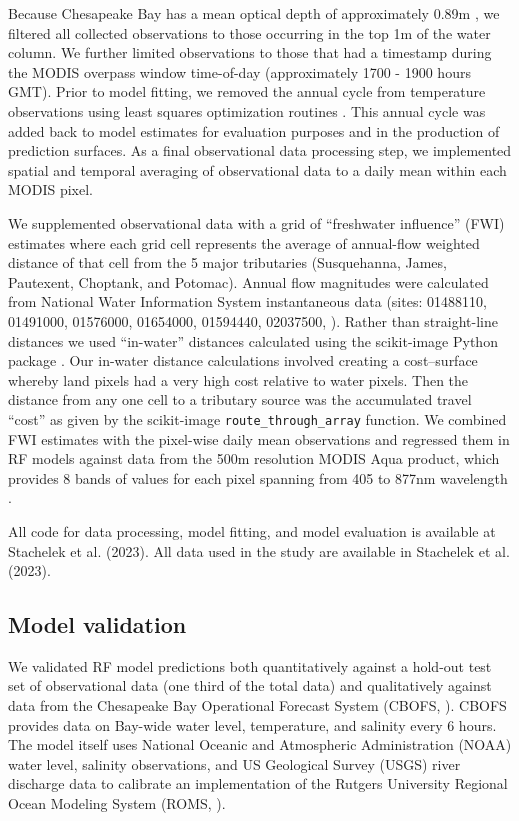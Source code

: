 \documentclass{article}
\begin{document}
Because Chesapeake Bay has a mean optical depth of approximately 0.89m \citep{urquhartRemotelySensedEstimates2012}, we filtered all collected observations to those occurring in the top 1m of the water column. We further limited observations to those that had a timestamp during the MODIS overpass window time-of-day (approximately 1700 - 1900 hours GMT). Prior to model fitting, we removed the annual cycle from temperature observations using least squares optimization routines \citep{virtanenSciPyFundamentalAlgorithms2020a}. This annual cycle was added back to model estimates for evaluation purposes and in the production of prediction surfaces. As a final observational data processing step, we implemented spatial and temporal averaging of observational data to a daily mean within each MODIS pixel. 

We supplemented observational data with a grid of “freshwater influence” (FWI) estimates where each grid cell represents the average of annual-flow weighted distance of that cell from the 5 major tributaries (Susquehanna, James, Pautexent, Choptank, and Potomac). Annual flow magnitudes were calculated from National Water Information System instantaneous data (sites: 01488110, 01491000, 01576000, 01654000, 01594440, 02037500, \citet{nwis2021usgs}). Rather than straight-line distances we used “in-water” distances calculated using the scikit-image Python package \citep{littleKrigingEstuariesCrow1997,vanderwaltScikitimageImageProcessing2014}. Our in-water distance calculations involved creating a cost–surface whereby land pixels had a very high cost relative to water pixels. Then the distance from any one cell to a tributary source was the accumulated travel “cost” as given by the scikit-image \texttt{route\_through\_array} function. We combined FWI estimates with the pixel-wise daily mean observations and regressed them in RF models against data from the 500m resolution MODIS Aqua product, which provides 8 bands of values for each pixel spanning from 405 to 877nm wavelength \citep{vermoteericMOD09GAMODISTerra2015}.

All code for data processing, model fitting, and model evaluation is available at Stachelek et al. (2023). All data used in the study are available in Stachelek et al. (2023).    


\subsection{Model validation}

We validated RF model predictions both quantitatively against a hold-out test set of observational data (one third of the total data) and qualitatively against data from the Chesapeake Bay Operational Forecast System (CBOFS, \citet{lanerolle2011second}). CBOFS provides data on Bay-wide water level, temperature, and salinity every 6 hours. The model itself uses National Oceanic and Atmospheric Administration (NOAA) water level, salinity observations, and US Geological Survey (USGS) river discharge data to calibrate an implementation of the Rutgers University Regional Ocean Modeling System (ROMS, \citet{shchepetkinRegionalOceanicModeling2005}).
\end{document}

